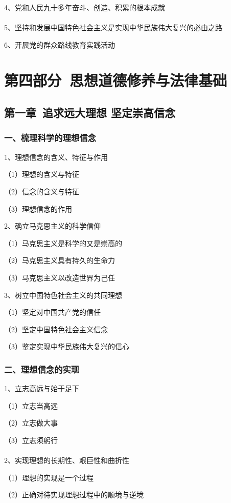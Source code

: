 \documentclass{ctexart}
\begin{document}
4、党和人民九十多年奋斗、创造、积累的根本成就
\\\\

5、坚持和发展中国特色社会主义是实现中华民族伟大复兴的必由之路

6、开展党的群众路线教育实践活动

\section{第四部分\ 思想道德修养与法律基础}


\subsection{第一章\ 追求远大理想 坚定崇高信念}
\subsubsection{一、梳理科学的理想信念}
1、理想信念的含义、特征与作用

（1）理想的含义与特征

（2）信念的含义与特征

（3）理想信念的作用

2、确立马克思主义的科学信仰

（1）马克思主义是科学的又是崇高的

（2）马克思主义具有持久的生命力

（3）马克思主义以改造世界为己任

3、树立中国特色社会主义的共同理想

（1）坚定对中国共产党的信任

（2）坚定中国特色社会主义信念

（3）鉴定实现中华民族伟大复兴的信心

\subsubsection{二、理想信念的实现}

1、立志高远与始于足下

（1）立志当高远

（2）立志做大事

（3）立志须躬行
\\\\

2、实现理想的长期性、艰巨性和曲折性

（1）理想的实现是一个过程

（2）正确对待实现理想过程中的顺境与逆境
\\\\
\end{document}

